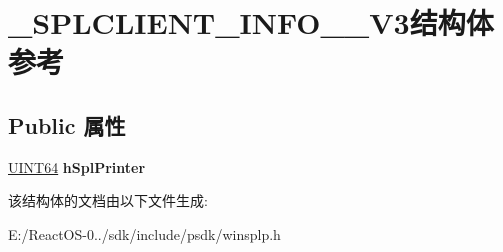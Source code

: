 \hypertarget{struct___s_p_l_c_l_i_e_n_t___i_n_f_o__2___v3}{}\section{\+\_\+\+S\+P\+L\+C\+L\+I\+E\+N\+T\+\_\+\+I\+N\+F\+O\+\_\+\_\+\+V3结构体 参考}
\label{struct___s_p_l_c_l_i_e_n_t___i_n_f_o__2___v3}
\subsection*{Public 属性}
\begin{DoxyCompactItemize}
\item 
\mbox{\label{struct___s_p_l_c_l_i_e_n_t___i_n_f_o__2___v3_a6eab4ae9e3c90d312b8fecc3cccb65c3}} 
\hyperlink{_processor_bind_8h_a57be03562867144161c1bfee95ca8f7c}{U\+I\+N\+T64} {\bfseries h\+Spl\+Printer}
\end{DoxyCompactItemize}


该结构体的文档由以下文件生成\+:\begin{DoxyCompactItemize}
\item 
E\+:/\+React\+O\+S-\/0../sdk/include/psdk/winsplp.\+h\end{DoxyCompactItemize}
